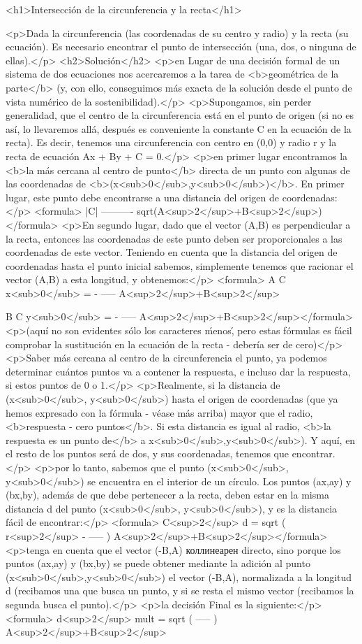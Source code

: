<h1>Intersección de la circunferencia y la recta</h1>

<p>Dada la circunferencia (las coordenadas de su centro y radio) y la recta (su ecuación). Es necesario encontrar el punto de intersección (una, dos, o ninguna de ellas).</p>
<h2>Solución</h2>
<p>en Lugar de una decisión formal de un sistema de dos ecuaciones nos acercaremos a la tarea de <b>geométrica de la parte</b> (y, con ello, conseguimos más exacta de la solución desde el punto de vista numérico de la sostenibilidad).</p>
<p>Supongamos, sin perder generalidad, que el centro de la circunferencia está en el punto de origen (si no es así, lo llevaremos allá, después es conveniente la constante C en la ecuación de la recta). Es decir, tenemos una circunferencia con centro en (0,0) y radio r y la recta de ecuación Ax + By + C = 0.</p>
<p>en primer lugar encontramos la <b>la más cercana al centro de punto</b> directa de un punto con algunas de las coordenadas de <b>(x<sub>0</sub>,y<sub>0</sub>)</b>. En primer lugar, este punto debe encontrarse a una distancia del origen de coordenadas:</p>
<formula> |C|
----------
sqrt(A<sup>2</sup>+B<sup>2</sup>)</formula>
<p>En segundo lugar, dado que el vector (A,B) es perpendicular a la recta, entonces las coordenadas de este punto deben ser proporcionales a las coordenadas de este vector. Teniendo en cuenta que la distancia del origen de coordenadas hasta el punto inicial sabemos, simplemente tenemos que racionar el vector (A,B) a esta longitud, y obtenemos:</p>
<formula> A C
x<sub>0</sub> = - -----
A<sup>2</sup>+B<sup>2</sup>

B C
y<sub>0</sub> = - -----
A<sup>2</sup>+B<sup>2</sup></formula>
<p>(aquí no son evidentes sólo los caracteres \'menos\', pero estas fórmulas es fácil comprobar la sustitución en la ecuación de la recta - debería ser de cero)</p>
<p>Saber más cercana al centro de la circunferencia el punto, ya podemos determinar cuántos puntos va a contener la respuesta, e incluso dar la respuesta, si estos puntos de 0 o 1.</p>
<p>Realmente, si la distancia de (x<sub>0</sub>, y<sub>0</sub>) hasta el origen de coordenadas (que ya hemos expresado con la fórmula - véase más arriba) mayor que el radio, <b>respuesta - cero puntos</b>. Si esta distancia es igual al radio, <b>la respuesta es un punto de</b> a x<sub>0</sub>,y<sub>0</sub>). Y aquí, en el resto de los puntos será de dos, y sus coordenadas, tenemos que encontrar.</p>
<p>por lo tanto, sabemos que el punto (x<sub>0</sub>, y<sub>0</sub>) se encuentra en el interior de un círculo. Los puntos (ax,ay) y (bx,by), además de que debe pertenecer a la recta, deben estar en la misma distancia d del punto (x<sub>0</sub>, y<sub>0</sub>), y es la distancia fácil de encontrar:</p>
<formula> C<sup>2</sup>
d = sqrt ( r<sup>2</sup> - ----- )
A<sup>2</sup>+B<sup>2</sup></formula>
<p>tenga en cuenta que el vector (-B,A) коллинеарен directo, sino porque los puntos (ax,ay) y (bx,by) se puede obtener mediante la adición al punto (x<sub>0</sub>,y<sub>0</sub>) el vector (-B,A), normalizada a la longitud d (recibamos una que busca un punto, y si se resta el mismo vector (recibamos la segunda busca el punto).</p>
<p>la decisión Final es la siguiente:</p>
<formula> d<sup>2</sup>
mult = sqrt ( ----- )
A<sup>2</sup>+B<sup>2</sup>

